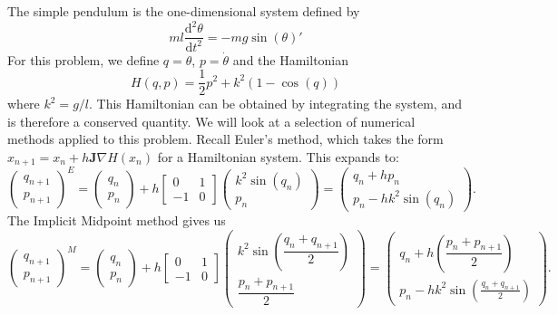 The simple pendulum is the one-dimensional system defined by
\begin{equation*}
	ml\frac{\mathrm{d}^2 \theta}{\mathrm{d}t^2} = - mg \sin(\theta)'
\end{equation*}
For this problem, we define $q = \theta$, $p = \dot{\theta}$ and the Hamiltonian
\begin{equation*}
	H(q,p) = \frac{1}{2}p^2 + k^2(1-\cos(q))
\end{equation*}
where $k^2 = g/l$.
This Hamiltonian can be obtained by integrating the system, and is therefore a conserved quantity.
We will look at a selection of numerical methods applied to this problem.
Recall Euler's method, which takes the form $x_{n+1} = x_n + h \mathbf{J} \nabla H(x_n)$ for a Hamiltonian system.
This expands to:
\begin{equation*}
	\begin{pmatrix}
		q_{n+1} \\
		p_{n+1}
	\end{pmatrix}^E = \begin{pmatrix}
		q_n \\
		p_n
	\end{pmatrix} + h \begin{bmatrix}
		0 & 1 \\
		-1 & 0
	\end{bmatrix} \begin{pmatrix}
		k^2 \sin(q_n) \\
		p_n
	\end{pmatrix} = \begin{pmatrix}
		q_n + h p_n \\
		p_n - h k^2 \sin(q_n)
	\end{pmatrix}.
\end{equation*}
The Implicit Midpoint method gives us
\begin{equation*}
	\begin{pmatrix}
		q_{n+1} \\
		p_{n+1}
	\end{pmatrix}^M = \begin{pmatrix}
		q_n \\
		p_n
	\end{pmatrix} + h \begin{bmatrix}
		0 & 1 \\
		-1 & 0
	\end{bmatrix} \begin{pmatrix}
		k^2 \sin \left(\dfrac{q_n + q_{n+1}}{2}\right) \\
		\dfrac{p_n + p_{n+1}}{2}
	\end{pmatrix} = \begin{pmatrix}
		q_n + h \left( \dfrac{p_n + p_{n+1}}{2} \right) \\
		p_n - h k^2 \sin \left( \frac{q_n + q_{n+1}}{2} \right)
	\end{pmatrix}.
\end{equation*}
